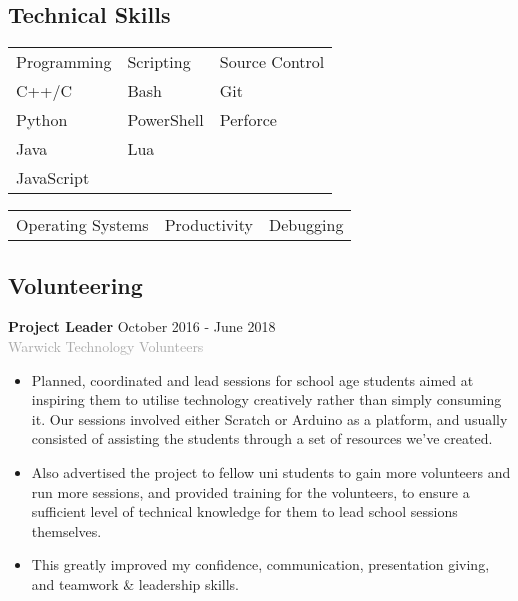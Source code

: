 \documentclass[11pt]{article}
\newcommand{\dash}{\item[-]}
\newcommand{\linesep}{\noindent\makebox[\linewidth]{\rule{\linewidth}{0.2pt}}}
\begin{document}
  \subsection*{Technical Skills}
   \begin{tabularx}{\linewidth}{X X X}
Programming & Scripting & Source Control \\
C++/C & Bash & Git \\
Python & PowerShell & Perforce \\
Java & Lua & \\
JavaScript && \\
   \end{tabularx}
   \begin{tabularx}{\linewidth}{X X X}
   Operating Systems & Productivity & Debugging
   \end{tabularx}
  \linesep

  \subsection*{Volunteering}
\textbf{Project Leader} \hfill October 2016 - June 2018 \\
\textcolor{darkgray}{Warwick Technology Volunteers}
   \begin{itemize}
    \dash Planned, coordinated and lead sessions for school age students aimed at inspiring them to utilise technology creatively rather than simply consuming it. Our sessions involved either Scratch or Arduino as a platform, and usually consisted of assisting the students through a set of resources we’ve created.
	\dash Also advertised the project to fellow uni students to gain more volunteers and run more sessions, and provided training for the volunteers, to ensure a sufficient level of technical knowledge for them to lead school sessions themselves.
	\dash This greatly improved my confidence, communication, presentation giving, and teamwork \& leadership skills.
   \end{itemize}
\end{document}
